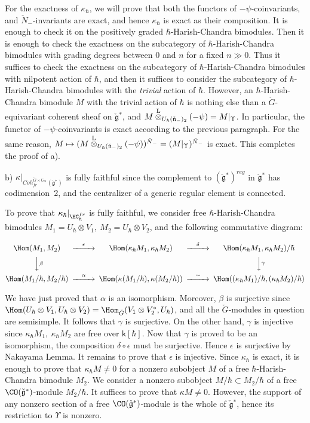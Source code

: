 \documentclass[11pt]{amsart}
\theoremstyle{definition}
\theoremstyle{remark}
\theoremstyle{remark}
\newcommand{\<}{\langle}
\renewcommand{\>}{\rangle}
\newcommand{\Lg}{\check{\mathfrak g}{}}
\newcommand{\Ln}{\check{\mathfrak n}{}}
\newcommand{\LN}{\check{N}{}}
\newcommand{\LG}{{\check{G}}}
\newcommand{\Lotimes}{\overset{\rm L}{\otimes}}
\newcommand{\Gm}{{{\mathbb G}_m}}
\newcommand{\HChfr}{\HC_\hbar^{fr}}
\newcommand{\kappah}{{\kappa_\hbar}}
\newcommand{\kk}{\mathsf k}
\begin{document}
For the exactness of $\kappa_\hbar$, we will prove that both the 
functors of $-\psi$-coinvariants, and $\LN_-$-invariants are exact,
and hence $\kappa_\hbar$ is exact as their composition.
It is enough to check it on the 
positively graded $\hbar$-Harish-Chandra bimodules. Then it is enough
to check the exactness on the subcategory of $\hbar$-Harish-Chandra
bimodules with grading degrees between 0 and $n$ for a fixed $n\gg0$.
Thus it suffices to check the exactness on the subcategory of 
$\hbar$-Harish-Chandra bimodules with nilpotent action of $\hbar$,
and then it suffices to consider the subcategory of
$\hbar$-Harish-Chandra bimodules with the {\em trivial} action of
$\hbar$. However, an $\hbar$-Harish-Chandra bimodule $M$ with the
trivial action of $\hbar$ is nothing else than a 
$\LG$-equivariant coherent sheaf
on $\Lg^*$, and $M\Lotimes_{U_\hbar(\Ln_-)_2}(-\psi)=M|_\Upsilon$.
In particular, the functor of $-\psi$-coinvariants is exact according
to the previous paragraph. For the same reason,
$M\mapsto(M\Lotimes_{U_\hbar(\Ln_-)_2}(-\psi))^{\LN_-}=(M|_\Upsilon)^{\LN_-}$
is exact. This completes the proof of a).

b) $\kappa|_{Coh_{fr}^{\LG\times \Gm}(\Lg^*)}$ is fully faithful
since the complement to $(\Lg^*)^{reg}$ in $\Lg^*$ has codimension~2,
and the centralizer of a generic regular element is connected.

To prove that $\kappah|_{\HChfr}$ is fully faithful, we consider
free $\hbar$-Harish-Chandra bimodules $M_1=U_\hbar\otimes V_1,\
M_2=U_\hbar\otimes V_2$, and the following commutative diagram:

\begin{equation}
\begin{CD}
\Hom(M_1,M_2)@>\epsilon>>\Hom(\kappah M_1,\kappah M_2)@>\delta>>
\Hom(\kappah M_1,\kappah M_2)/\hbar\\
@VV\beta V @. @VV\gamma V\\
\Hom(M_1/\hbar,M_2/\hbar)@>\alpha>>\Hom(\kappa(M_1/\hbar),\kappa(M_2/\hbar))
@>\sim>>\Hom((\kappah M_1)/\hbar,(\kappah M_2)/\hbar)
\end{CD}
\end{equation}

We have just proved that $\alpha$ is an isomorphism. Moreover, $\beta$
is surjective since $\Hom(U_\hbar\otimes V_1,U_\hbar\otimes V_2)=
\Hom_\LG(V_1\otimes V_2^*,U_\hbar)$, and all the $\LG$-modules in
question are semisimple. It follows that $\gamma$ is surjective.
On the other hand, $\gamma$ is injective since $\kappah M_1,\ \kappah
M_2$ are free over $\kk[\hbar]$. Now that $\gamma$ is proved to be an
isomorphism, the composition $\delta\circ\epsilon$ must be surjective.
Hence $\epsilon$ is surjective by Nakayama Lemma. It remains to prove
that $\epsilon$ is injective. Since $\kappah$ is exact, it is enough
to prove that $\kappah M\ne0$ for a nonzero subobject $M$ of a free
$\hbar$-Harish-Chandra bimodule $M_2$. We consider a nonzero subobject
$M/\hbar\subset M_2/\hbar$ of a free $\CO(\Lg^*)$-module $M_2/\hbar$.
It suffices to prove that $\kappa M\ne0$. However, the support of any
nonzero section of a free $\CO(\Lg^*)$-module is the whole of $\Lg^*$,
hence its restriction to $\Upsilon$ is nonzero.
\end{document}

